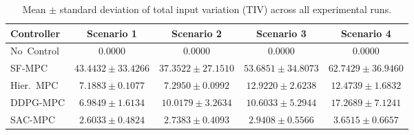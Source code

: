 \begin{table}[htbp]
\centering
\caption{Mean $\pm$ standard deviation of total input variation (TIV) across all experimental runs.}
\label{tab:tv_comparison}
\begin{tabular}{lcccc}
\toprule
Controller & Scenario 1 & Scenario 2 & Scenario 3 & Scenario 4 \\
\midrule
No~Control & $0.0000$ & $0.0000$ & $0.0000$ & $0.0000$ \\
SF-MPC & $43.4432 \pm 33.4266$ & $37.3522 \pm 27.1510$ & $53.6851 \pm 34.8073$ & $62.7429 \pm 36.9460$ \\
Hier.~MPC & $7.1883 \pm 0.1077$ & $7.2950 \pm 0.0992$ & $12.9220 \pm 2.6238$ & $12.4739 \pm 1.6832$ \\
DDPG-MPC & $6.9849 \pm 1.6134$ & $10.0179 \pm 3.2634$ & $10.6033 \pm 5.2944$ & $17.2689 \pm 7.1241$ \\
SAC-MPC & $2.6033 \pm 0.4824$ & $2.7383 \pm 0.4093$ & $2.9408 \pm 0.5566$ & $3.6515 \pm 0.6657$ \\
\bottomrule
\end{tabular}
\end{table}
